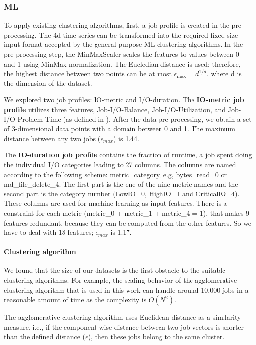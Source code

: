 \documentclass{jhps}
\makeatletter
\newcommand{\jk}[1]{\todo[inline]{JK:\@#1}}
\makeatother
\begin{document}
\subsubsection{ML}

To apply existing clustering algorithms, first, a job-profile is created in the pre-processing.
The 4d time series can be transformed into the required fixed-size input format accepted by the general-purpose ML clustering algorithms.
In the pre-processing step, the MinMaxScaler scales the features to values between 0 and 1 using MinMax normalization.
The Eucledian distance is used; therefore, the highest distance between two points can be at most \(\epsilon_\text{max} = d^{1/d}\), where d is the dimension of the dataset.

We explored two job profiles: IO-metric and I/O-duration.
The \textbf{IO-metric job profile} utilizes three features, Job-I/O-Balance, Job-I/O-Utilization, and Job-I/O-Problem-Time (as defined in \cite{iocats2020}).
After the data pre-processing, we obtain a set of 3-dimensional data points with a domain between 0 and 1.
The maximum distance between any two jobs ($\epsilon_{max}$) is 1.44.

The \textbf{IO-duration job profile} contains the fraction of runtime, a job spent doing the individual I/O categories leading to 27 columns.
The columns are named according to the following scheme: metric\_category, e.g, bytes\_read\_0 or md\_file\_delete\_4.
The first part is the one of the nine metric names and the second part is the category number (LowIO=0, HighIO=1 and CriticalIO=4).
These columns are used for machine learning as input features.
There is a constraint for each metric (metric\_0 + metric\_1 + metric\_4 = 1), that makes 9 features redundant, because they can be computed from the other features.
So we have to deal with 18 features; $\epsilon_{max}$ is 1.17.

\paragraph{Clustering algorithm}
We found that the size of our datasets is the first obstacle to the suitable clustering algorithms.
For example, the scaling behavior of the agglomerative clustering algorithm that is used in this work can handle around 10,000 jobs in a reasonable amount of time as the complexity is $O(N^{2})$.

The agglomerative clustering algorithm uses Euclidean distance as a similarity measure, i.e., if the component wise distance between two job vectors is shorter than the defined distance ($\epsilon$), then these jobs belong to the same cluster.
\end{document}
